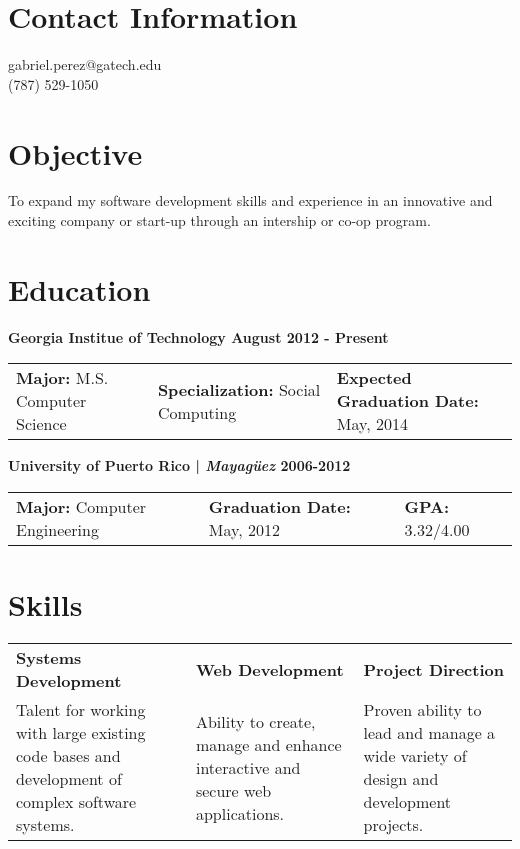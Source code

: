 \documentclass[margin,line]{res}
\begin{document}


\begin{resume}
\section{\sc Contact Information}
\vspace{.05in}
gabriel.perez@gatech.edu \\
(787) 529-1050       



\section{\sc Objective}
							To expand my software development skills and experience in an innovative and exciting company or start-up through an intership or co-op program.

\section{\sc Education}

{\bf Georgia Institue of Technology \hfill {\bf August 2012 - Present } }
\vspace{-.01cm}
\begin{tabular}{@{}p{2in}p{2in}p{2in}}
 {\bf Major:}  M.S. Computer Science & {\bf Specialization:} Social Computing & {\bf Expected Graduation Date:} May, 2014 \\            
\end{tabular}

{\bf University of Puerto Rico | {\em Mayag\"uez } \hfill {\bf 2006-2012 } }
\vspace{-.01cm}
\begin{tabular}{@{}p{2in}p{2in}p{2in}}
 {\bf Major:} Computer Engineering           & {\bf Graduation Date:} May, 2012  & {\bf GPA:} 3.32/4.00  \\            
\end{tabular}


\section{\sc Skills}
\begin{tabular}{@{}p{2in}p{2in}p{1.7in}}
{\bf Systems Development}             & {\bf Web Development}  & {\bf Project Direction} \\            
Talent for working with large existing code bases and development of complex software systems. & Ability to create, manage and enhance interactive and secure web applications. & Proven ability to lead and manage a wide variety of design and development projects.   
\end{tabular}


\end{resume}
\end{document}
